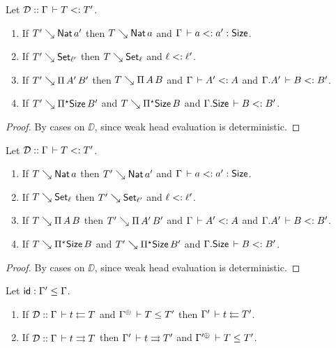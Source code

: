 \begin{lemma}
\label{lem:whdsub}
Let $\DD :: \Gamma \der T \asub T'$.
\begin{enumerate}
\item If\/ $T' \evalsto \Nat a'$ then $T \evalsto \Nat a$ and $\Gamma \der a \asub a' : \Size$.
\item If\/ $T' \evalsto \Set[\ell']$ then $T \evalsto \Set[\ell]$ and $\ell \asub \ell'$.
\item If\/ $T' \evalsto \piT{A'}{B'}$ then $T \evalsto \piT {A} {B}$ and
      $\Gamma \der A' \asub A$ and $\cext \Gamma {A'} \der B \asub B'$.
\item If\/ $T' \evalsto \epiT \Size {B'}$ and $T \evalsto \epiT \Size B$ and $\cext \Gamma \Size \der B \asub B'$.
\end{enumerate}
\end{lemma}
\begin{proof}
  By cases on $\DD$, since weak head evaluation is deterministic.
\end{proof}
\begin{lemma}
\label{lem:whdsuper}
Let $\DD :: \Gamma \der T \asub T'$.
\begin{enumerate}
\item If\/ $T \evalsto \Nat a$ then $T' \evalsto \Nat a'$ and $\Gamma \der a \asub a' : \Size$.
\item If\/ $T \evalsto \Set[\ell]$ then $T' \evalsto \Set[\ell']$ and $\ell \asub \ell'$.
\item If\/ $T \evalsto \piT A B$ then $T' \evalsto \piT {A'} {B'}$ and
      $\Gamma \der A' \asub A$ and $\cext \Gamma {A'} \der B \asub B'$.
\item If\/ $T \evalsto \epiT \Size B$ and $T' \evalsto \epiT \Size B'$ and $\cext \Gamma \Size \der B \asub B'$.
\end{enumerate}
\end{lemma}
\begin{proof}
  By cases on $\DD$, since weak head evaluation is deterministic.
\end{proof}
\begin{lemma}
  \label{lem:subtc}
  Let $\sid : \Gamma' \leq \Gamma$.
  \begin{enumerate}
  \item If\/ $\DD :: \Gamma \der t \jchk T$ and $\resurrect\Gamma \der T \leq T'$ then $\Gamma' \der t \jchk T'$.
  \item If\/ $\DD :: \Gamma \der t \jinf T$ then $\Gamma' \der t \jinf T'$ and $\resurrect{\Gamma'} \der T \leq T'$.
  \end{enumerate}
\end{lemma}
